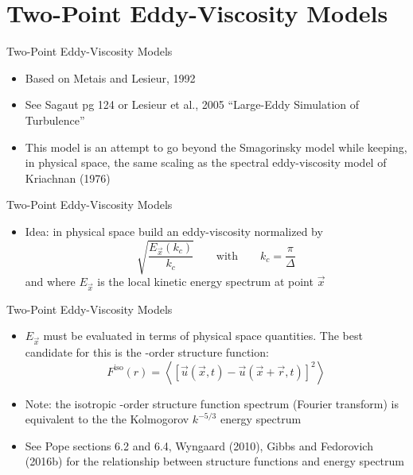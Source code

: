 \section{Two-Point Eddy-Viscosity Models} %
\begin{frame}{Two-Point Eddy-Viscosity Models}
\begin{itemize}
	\item Based on Metais and Lesieur, 1992
	\item See Sagaut pg 124 or Lesieur et al., 2005 ``Large-Eddy Simulation of Turbulence''
	\item This model is an attempt to go beyond the Smagorinsky model while keeping, in physical space, the same scaling as the spectral eddy-viscosity model of Kriachnan (1976) 
\end{itemize}

\end{frame}
\begin{frame}{Two-Point Eddy-Viscosity Models}
\begin{itemize}
	\item Idea: in physical space build an eddy-viscosity normalized by
	$$\sqrt{\frac{E_{\vec{x}}(k_c)}{k_c}} \qquad \text{with} \qquad k_c = \frac{\pi}{\Delta}$$
	and where $E_{\vec{x}}$ is the local kinetic energy spectrum at point $\vec{x}$
\end{itemize}

\end{frame}

\begin{frame}{Two-Point Eddy-Viscosity Models}
\begin{itemize}
	\item $E_{\vec{x}}$ must be evaluated in terms of physical space quantities.  The best candidate for this is the -order structure function:
	$$F^{\text{iso}} (r) = \left\langle \left[ \vec{u}(\vec{x},t) - \vec{u}(\vec{x}+\vec{r},t)\right]^2\right\rangle$$
	\item Note: the isotropic -order structure function spectrum (Fourier transform) is  equivalent to the the Kolmogorov $k^{-5/3}$ energy spectrum
	\item See Pope sections 6.2 and 6.4, Wyngaard (2010), Gibbs and Fedorovich (2016b) for the relationship between structure functions and energy spectrum
\end{itemize}

\end{frame}

